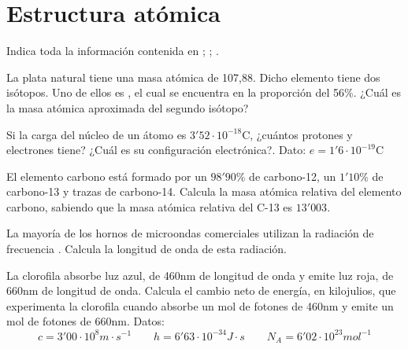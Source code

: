 \section{Estructura atómica}

\begin{prob}
Indica toda la información contenida en ; ;
.
\end{prob}

\begin{prob}
La plata natural tiene una masa atómica de 107,88. Dicho elemento tiene dos isótopos. Uno
de ellos es , el cual se encuentra en la proporción del 56\%. ¿Cuál es
la masa atómica aproximada del segundo isótopo?
\end{prob}

\begin{prob}
Si la carga del núcleo de un átomo es $3'52 \cdot 10^{-18}$C, ¿cuántos protones y 
electrones tiene? ¿Cuál es su configuración electrónica?. Dato: $e = 1'6 \cdot 10^{-19}$C
\end{prob}

\begin{prob}
El elemento carbono está formado por un $98'90\%$ de carbono-12, un $1'10\%$ de
carbono-13 y trazas de carbono-14. Calcula la masa atómica relativa del elemento carbono,
sabiendo que la masa atómica relativa del C-13 es $13'003$.
\end{prob}

\begin{prob}
La mayoría de los hornos de microondas comerciales utilizan la radiación de frecuencia
. Calcula la longitud de onda de esta radiación.
\end{prob}

\begin{prob}
La clorofila absorbe luz azul, de 460nm de longitud de onda y emite luz roja, de 660nm de 
longitud de onda. Calcula el cambio neto de energía, en kilojulios, que experimenta la
clorofila cuando absorbe un mol de fotones de 460nm y emite un mol de fotones de 660nm.
Datos:
\begin{displaymath}
c = 3'00 \cdot 10^8 m \cdot s^{-1} \qquad
h = 6'63 \cdot 10^{-34} J \cdot s \qquad
N_A = 6'02 \cdot 10^{23} mol^{-1}
\end{displaymath}
\end{prob}

